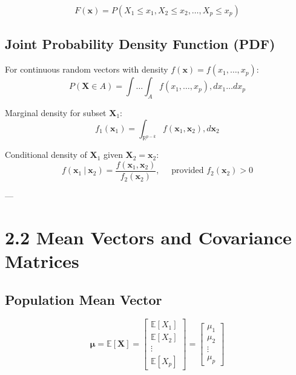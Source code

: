\documentclass[
]{article}
\begin{document}
\[F\left( \mathbf{x} \right) = P\left( X_{1} \leq x_{1},X_{2} \leq x_{2},\ldots,X_{p} \leq x_{p} \right)\]

\textbf{ }

\subsection{Joint Probability Density Function (PDF)}

For continuous random vectors with density
\(f\left( \mathbf{x} \right) = f\left( x_{1},\ldots,x_{p} \right)\):
\[P\left( \mathbf{X} \in A \right) = \int\ldots\int_{A}f\left( x_{1},\ldots,x_{p} \right),dx_{1}\ldots dx_{p}\]

Marginal density for subset \(\mathbf{X}_{1}\):
\[f_{1}\left( \mathbf{x}_{1} \right) = \int_{\mathbb{R}^{p - k}}f\left( \mathbf{x}_{1},\mathbf{x}_{2} \right),d\mathbf{x}_{2}\]

Conditional density of \(\mathbf{X}_{1}\) given
\(\mathbf{X}_{2} = \mathbf{x}_{2}\):
\[f\left( \mathbf{x}_{1}~|~\mathbf{x}_{2} \right) = \frac{f\left( \mathbf{x}_{1},\mathbf{x}_{2} \right)}{f_{2}\left( \mathbf{x}_{2} \right)},\quad\text{ provided  }f_{2}\left( \mathbf{x}_{2} \right) > 0\]

---

\textbf{ }

\section{2.2 Mean Vectors and Covariance Matrices}

\textbf{ }

\subsection{Population Mean Vector}

\[\mathbf{\mu} = \mathbb{E}\left\lbrack \mathbf{X} \right\rbrack = \begin{bmatrix}
\mathbb{E}\left\lbrack X_{1} \right\rbrack \\
\mathbb{E}\left\lbrack X_{2} \right\rbrack \\
 \vdots \\
\mathbb{E}\left\lbrack X_{p} \right\rbrack
\end{bmatrix} = \begin{bmatrix}
\mu_{1} \\
\mu_{2} \\
 \vdots \\
\mu_{p}
\end{bmatrix}\]
\end{document}
